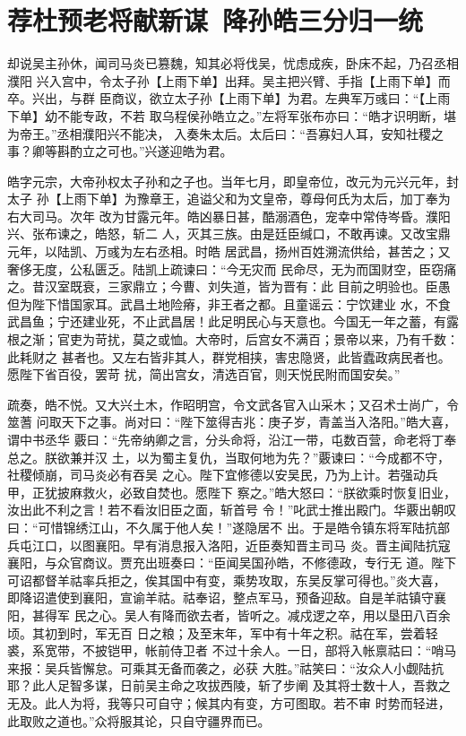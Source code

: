 \chapter{荐杜预老将献新谋~降孙皓三分归一统}

却说吴主孙休，闻司马炎已篡魏，知其必将伐吴，忧虑成疾，卧床不起，乃召丞相濮阳
兴入宫中，令太子孙【上雨下单】出拜。吴主把兴臂、手指【上雨下单】而卒。兴出，与群
臣商议，欲立太子孙【上雨下单】为君。左典军万彧曰：“【上雨下单】幼不能专政，不若
取乌程侯孙皓立之。”左将军张布亦曰：“皓才识明断，堪为帝王。”丞相濮阳兴不能决，
入奏朱太后。太后曰：“吾寡妇人耳，安知社稷之事？卿等斟酌立之可也。”兴遂迎皓为君。

皓字元宗，大帝孙权太子孙和之子也。当年七月，即皇帝位，改元为元兴元年，封太子
孙【上雨下单】为豫章王，追谥父和为文皇帝，尊母何氏为太后，加丁奉为右大司马。次年
改为甘露元年。皓凶暴日甚，酷溺酒色，宠幸中常侍岑昏。濮阳兴、张布谏之，皓怒，斩二
人，灭其三族。由是廷臣缄口，不敢再谏。又改宝鼎元年，以陆凯、万彧为左右丞相。时皓
居武昌，扬州百姓溯流供给，甚苦之；又奢侈无度，公私匮乏。陆凯上疏谏曰：“今无灾而
民命尽，无为而国财空，臣窃痛之。昔汉室既衰，三家鼎立；今曹、刘失道，皆为晋有：此
目前之明验也。臣愚但为陛下惜国家耳。武昌土地险瘠，非王者之都。且童谣云：宁饮建业
水，不食武昌鱼；宁还建业死，不止武昌居！此足明民心与天意也。今国无一年之蓄，有露
根之渐；官吏为苛扰，莫之或恤。大帝时，后宫女不满百；景帝以来，乃有千数：此耗财之
甚者也。又左右皆非其人，群党相挟，害忠隐贤，此皆蠹政病民者也。愿陛下省百役，罢苛
扰，简出宫女，清选百官，则天悦民附而国安矣。”

疏奏，皓不悦。又大兴土木，作昭明宫，令文武各官入山采木；又召术士尚广，令筮蓍
问取天下之事。尚对曰：“陛下筮得吉兆：庚子岁，青盖当入洛阳。”皓大喜，谓中书丞华
覈曰：“先帝纳卿之言，分头命将，沿江一带，屯数百营，命老将丁奉总之。朕欲兼并汉
土，以为蜀主复仇，当取何地为先？”覈谏曰：“今成都不守，社稷倾崩，司马炎必有吞吴
之心。陛下宜修德以安吴民，乃为上计。若强动兵甲，正犹披麻救火，必致自焚也。愿陛下
察之。”皓大怒曰：“朕欲乘时恢复旧业，汝出此不利之言！若不看汝旧臣之面，斩首号
令！”叱武士推出殿门。华覈出朝叹曰：“可惜锦绣江山，不久属于他人矣！”遂隐居不
出。于是皓令镇东将军陆抗部兵屯江口，以图襄阳。早有消息报入洛阳，近臣奏知晋主司马
炎。晋主闻陆抗寇襄阳，与众官商议。贾充出班奏曰：“臣闻吴国孙皓，不修德政，专行无
道。陛下可诏都督羊祜率兵拒之，俟其国中有变，乘势攻取，东吴反掌可得也。”炎大喜，
即降诏遣使到襄阳，宣谕羊祜。祜奉诏，整点军马，预备迎敌。自是羊祜镇守襄阳，甚得军
民之心。吴人有降而欲去者，皆听之。减戍逻之卒，用以垦田八百余顷。其初到时，军无百
日之粮；及至末年，军中有十年之积。祜在军，尝着轻裘，系宽带，不披铠甲，帐前侍卫者
不过十余人。一日，部将入帐禀祜曰：“哨马来报：吴兵皆懈怠。可乘其无备而袭之，必获
大胜。”祜笑曰：“汝众人小觑陆抗耶？此人足智多谋，日前吴主命之攻拔西陵，斩了步阐
及其将士数十人，吾救之无及。此人为将，我等只可自守；候其内有变，方可图取。若不审
时势而轻进，此取败之道也。”众将服其论，只自守疆界而已。

